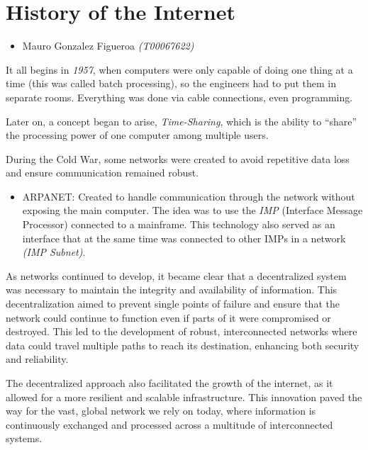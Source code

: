 \documentclass[letterpaper, 12pt]{article}
\begin{document}
\section*{History of the Internet}


\begin{itemize}[label=$\triangleright$]
      \item Mauro Gonzalez Figueroa \textit{(T00067622)}
\end{itemize}

\nocite{*}

It all begins in \textit{1957}, when computers were only capable of doing one
thing at a time (this was called batch processing), so the engineers had to put
them in separate rooms. Everything was done via cable connections, even
programming.

Later on, a concept began to arise, \textit{Time-Sharing}, which is the ability
to ``share'' the processing power of one computer among multiple users.

During the Cold War, some networks were created to avoid repetitive data loss
and ensure communication remained robust.

\begin{itemize}
      \item ARPANET:\@{} Created to handle communication through the network without
            exposing the main computer. The idea was to use the \textit{IMP} (Interface
            Message Processor) connected to a mainframe. This technology also served as an
            interface that at the same time was connected to other IMPs in a network
            \textit{(IMP Subnet)}.
\end{itemize}

As networks continued to develop, it became clear that a decentralized system
was necessary to maintain the integrity and availability of information. This
decentralization aimed to prevent single points of failure and ensure that the
network could continue to function even if parts of it were compromised or
destroyed. This led to the development of robust, interconnected networks where
data could travel multiple paths to reach its destination, enhancing both
security and reliability.

The decentralized approach also facilitated the growth of the internet, as it
allowed for a more resilient and scalable infrastructure. This innovation paved
the way for the vast, global network we rely on today, where information is
continuously exchanged and processed across a multitude of interconnected
systems.

\printbibliography
\end{document}
